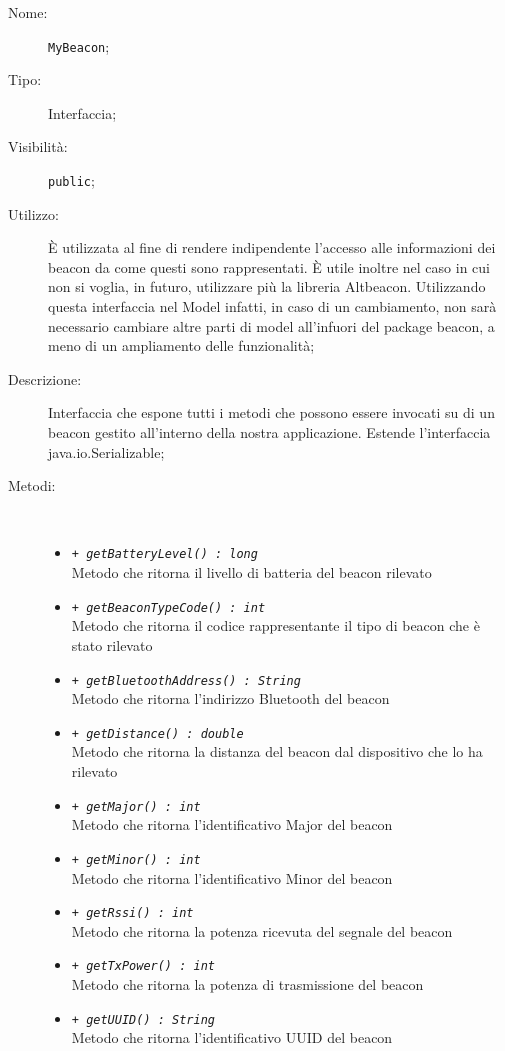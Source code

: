 \documentclass[../DefinizioneDiProdotto.tex]{subfiles}
\begin{document}
    \begin{description}
\item[Nome:] \texttt{MyBeacon};
\item[Tipo:] Interfaccia;
\item[Visibilità:] \texttt{public};
\item[Utilizzo:] È utilizzata al fine di rendere indipendente l'accesso alle informazioni dei beacon da come questi sono rappresentati. È utile inoltre nel caso in cui non si voglia, in futuro, utilizzare più la libreria Altbeacon. Utilizzando questa interfaccia nel Model infatti, in caso di un cambiamento, non sarà necessario cambiare altre parti di model all'infuori del package beacon, a meno di un ampliamento delle funzionalità;
\item[Descrizione:] Interfaccia che espone tutti i metodi che possono essere invocati su di un beacon gestito all'interno della nostra applicazione. Estende l'interfaccia java.io.Serializable;
\item[Metodi:] \
\begin{itemize}
\item \texttt{+ \textit{getBatteryLevel() : long}}\\
Metodo che ritorna il livello di batteria del beacon rilevato
 \item \texttt{+ \textit{getBeaconTypeCode() : int}}\\
Metodo che ritorna il codice rappresentante il tipo di beacon che è stato rilevato
 \item \texttt{+ \textit{getBluetoothAddress() : String}}\\
Metodo che ritorna l'indirizzo Bluetooth del beacon
 \item \texttt{+ \textit{getDistance() : double}}\\
Metodo che ritorna la distanza del beacon dal dispositivo che lo ha rilevato
 \item \texttt{+ \textit{getMajor() : int}}\\
Metodo che ritorna l'identificativo Major del beacon
 \item \texttt{+ \textit{getMinor() : int}}\\
Metodo che ritorna l'identificativo Minor del beacon
 \item \texttt{+ \textit{getRssi() : int}}\\
Metodo che ritorna la potenza ricevuta del segnale del beacon
 \item \texttt{+ \textit{getTxPower() : int}}\\
Metodo che ritorna la potenza di trasmissione del beacon
 \item \texttt{+ \textit{getUUID() : String}}\\
Metodo che ritorna l'identificativo UUID del beacon
 \end{itemize}
\end{description}
\end{document}
